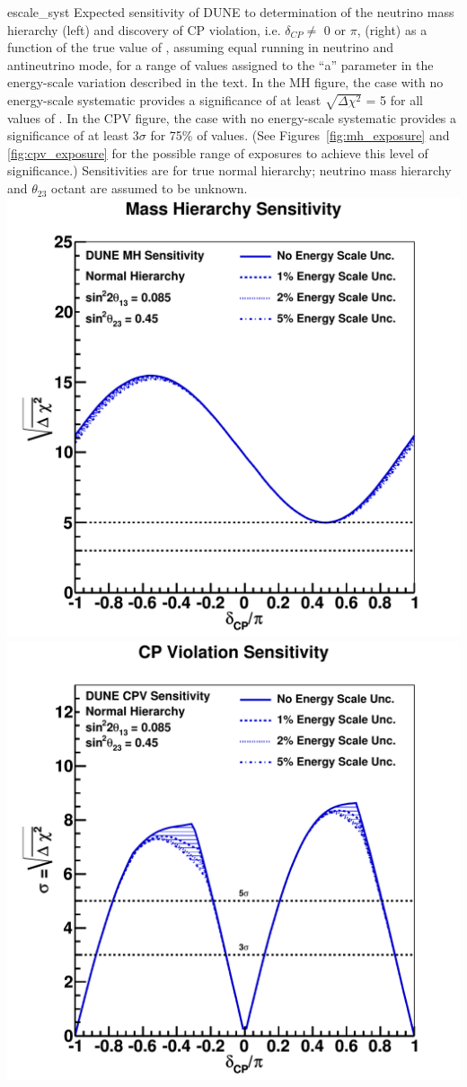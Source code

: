 \begin{cdrfigure}{escale_syst}{
Expected sensitivity of DUNE to determination of the neutrino mass
  hierarchy (left) and discovery of CP violation, i.e. $\delta_{CP} \ne$ 0 or $\pi$,
  (right) as a function of the true value of \deltacp, assuming 
  equal running in neutrino and antineutrino mode, for a range of values assigned to the
  ``a'' parameter in the energy-scale variation described in the text. In the MH figure, the case with no
  energy-scale systematic provides a significance of at least $\sqrt{\Delta\chi^2}$ = 5 for
  all values of \deltacp. In the CPV figure, the case with no energy-scale systematic provides
  a significance of at least 3$\sigma$ for 75\% of \deltacp values.
  (See Figures~\ref{fig:mh_exposure} and \ref{fig:cpv_exposure} for the possible range of exposures
  to achieve this level of significance.)
  Sensitivities are for true normal hierarchy; neutrino mass hierarchy
  and $\theta_{23}$ octant are assumed to be unknown.}
\includegraphics[width=0.44\linewidth]{volume-physics/figures/mh_230ktmwyear_varyesyst.pdf}
\includegraphics[width=0.44\linewidth]{volume-physics/figures/cpv_890ktmwyear_varyesyst.pdf}
\end{cdrfigure}
%
